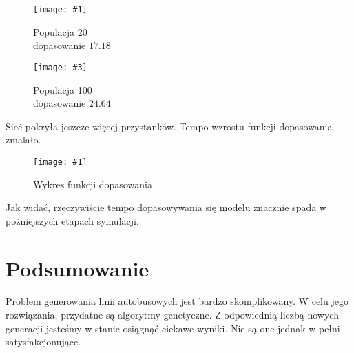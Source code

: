 \documentclass[12pt,a4paper,openright]{mwrep}
\newcommand{\imgcustomsize}[3]{
	\begin{figure}[H]
		\centering
		\texttt{[image: \#1]}
		\caption{#2}
	\end{figure}
}
\newcommand{\imgsidebyside}[4]{
	\begin{figure}[H]
		\centering
		\begin{minipage}{.45\textwidth}
			\centering
			\texttt{[image: \#1]}
			\caption{#2}
		\end{minipage}%
		\hfill
		\begin{minipage}{.45\textwidth}
			\centering
			\texttt{[image: \#3]}
			\caption{#4}
		\end{minipage}
	\end{figure}
}
\begin{document}
\imgsidebyside{test1/20}{Populacja 20\\ dopasowanie $17.18$}{test1/100}{Populacja 100\\ dopasowanie $24.64$}
Sieć pokryła jeszcze więcej przystanków. Tempo wzrostu funkcji dopasowania zmalało.

\imgcustomsize{test1/plot}{Wykres funkcji dopasowania}{0.6}
Jak widać, rzeczywiście tempo dopasowywania się modelu znacznie spada w poźniejszych etapach symulacji.

\chapter{Podsumowanie}

Problem generowania linii autobusowych jest bardzo skomplikowany. W celu jego rozwiązania, przydatne są algorytmy genetyczne. Z odpowiednią liczbą nowych generacji jesteśmy w stanie osiągnąć ciekawe wyniki. Nie są one jednak w pełni satysfakcjonujące.
\end{document}
